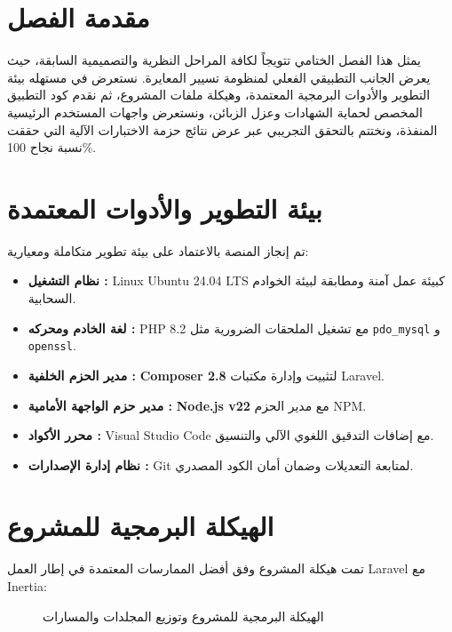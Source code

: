 \documentclass{bts-report-ar}
\begin{document}
\section*{مقدمة الفصل}
يمثل هذا الفصل الختامي تتويجاً لكافة المراحل النظرية والتصميمية السابقة، حيث يعرض الجانب التطبيقي الفعلي لمنظومة تسيير المعايرة. نستعرض في مستهله بيئة التطوير والأدوات البرمجية المعتمدة، وهيكلة ملفات المشروع، ثم نقدم كود التطبيق المخصص لحماية الشهادات وعزل الزبائن، ونستعرض واجهات المستخدم الرئيسية المنفذة، ونختتم بالتحقق التجريبي عبر عرض نتائج حزمة الاختبارات الآلية التي حققت نسبة نجاح 100\%.

\section{بيئة التطوير والأدوات المعتمدة}
تم إنجاز المنصة بالاعتماد على بيئة تطوير متكاملة ومعيارية:
\begin{itemize}
  \item \textbf{نظام التشغيل :} Linux Ubuntu 24.04 LTS كبيئة عمل آمنة ومطابقة لبيئة الخوادم السحابية.
  \item \textbf{لغة الخادم ومحركه :} PHP 8.2 مع تشغيل الملحقات الضرورية مثل \texttt{pdo\_mysql} و \texttt{openssl}.
  \item \textbf{مدير الحزم الخلفية :} \textbf{Composer 2.8} لتثبيت وإدارة مكتبات Laravel.
  \item \textbf{مدير حزم الواجهة الأمامية :} \textbf{Node.js v22} مع مدير الحزم NPM.
  \item \textbf{محرر الأكواد :} Visual Studio Code مع إضافات التدقيق اللغوي الآلي والتنسيق.
  \item \textbf{نظام إدارة الإصدارات :} Git لمتابعة التعديلات وضمان أمان الكود المصدري.
\end{itemize}

\section{الهيكلة البرمجية للمشروع}
تمت هيكلة المشروع وفق أفضل الممارسات المعتمدة في إطار العمل Laravel مع Inertia:

\begin{figure}[H]
  \centering
  \begin{LTR}
  
  \end{LTR}
  \caption{الهيكلة البرمجية للمشروع وتوزيع المجلدات والمسارات}
  \label{fig:app-structure}
\end{figure}
\end{document}
